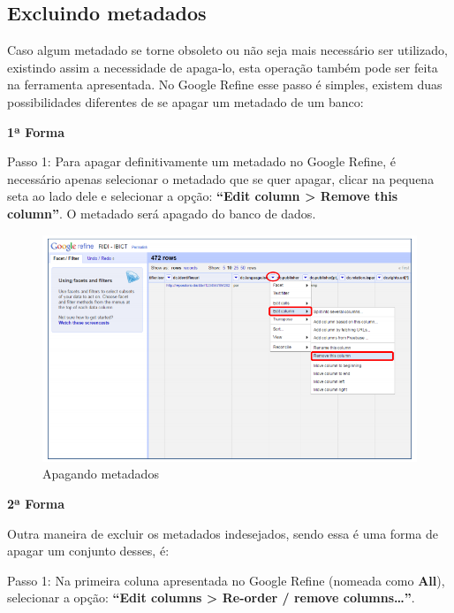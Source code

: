\documentclass[12pt,hidelinks]{article}
\begin{document}
\newpage
    
    \subsection{Excluindo metadados}
    
    Caso algum metadado se torne obsoleto ou não seja mais necessário ser utilizado, existindo assim a necessidade de apaga-lo, esta operação também pode ser feita na ferramenta apresentada. No Google Refine esse passo é simples, existem duas possibilidades diferentes de se apagar um metadado de um banco: 
    
    \singlespacing
    
    \textbf{1ª Forma}
    
    \singlespacing
    
    Passo 1: Para apagar definitivamente um metadado no Google Refine, é necessário apenas selecionar o metadado que se quer apagar, clicar na pequena seta ao lado dele e selecionar a opção: \textbf{“Edit column > Remove this column”}. O metadado será apagado do banco de dados.
    
    \begin{figure}[!htp]
                \centering
                \includegraphics[scale=0.8]{figura/Figura200.png}
                \caption{Apagando metadados}
            \label{Rotulo}
        \end{figure}
    
    \textbf{2ª Forma}
    
    Outra maneira de excluir os metadados indesejados, sendo essa é uma forma de apagar um conjunto desses, é: 
    
    \singlespacing
    
    Passo 1: Na primeira coluna apresentada no Google Refine (nomeada como \textbf{All}), selecionar a opção: \textbf{“Edit columns > Re-order / remove columns…”}.
    
\end{document}
